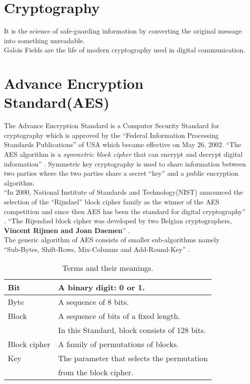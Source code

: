 \section{Cryptography}
It is the science of safe-guarding information by converting the original message into something unreadable.\\
Galois Fields are the life of modern cryptography used in digital communication.

\section{Advance Encryption Standard(AES)}
The Advance Encryption Standard is a Computer Security Standard for cryptography which is approved by the ``Federal Information Processing Standards Publications'' of USA which became effective on May 26, 2002. ``The AES algorithm is a \textit{symmetric block cipher} that can encrypt and decrypt digital information'' \cite{aes}. Symmetric key cryptography is used to share information between two parties where the two parties share a secret ``key'' and a public encryption algorithm.\\

``In 2000, National Institute of Standards and Technology(NIST) announced the selection of the ``Rijndael'' block cipher family as the winner of the AES competition and since then AES has been the standard for digital cryptography'' \cite{aes}. ``The Rijendael block cipher was developed by two Belgian cryptographers, \textbf{Vincent Rijmen and Joan Daemen}'' \cite{aes}.\\

The generic algorithm of AES consists of smaller sub-algorithms namely\\ ``Sub-Bytes, Shift-Rows, Mix-Columns and Add-Round-Key'' \cite{aes}.

\begin{table}[h!]
  \centering
\begin{tabular}{|l|l|}
  \hline
  Bit & \hspace{7mm}A binary digit: 0 or 1.\\
    \hline
  Byte & \hspace{7mm}A sequence of 8 bits.\\
    \hline
  Block & \hspace{7mm} A sequence of bits of a fixed length.\\
  \ & \hspace{13mm}In this Standard, block consists of 128 bits.\\
    \hline
  Block cipher &  \hspace{7mm} A family of permutations of blocks.\\
    \hline
  Key & \hspace{7mm}The parameter that selects the permutation\\
  \ & \hspace{13mm}from the block cipher.\\
    \hline
\end{tabular}
\caption{\small Terms and their meanings.}
\end{table}


